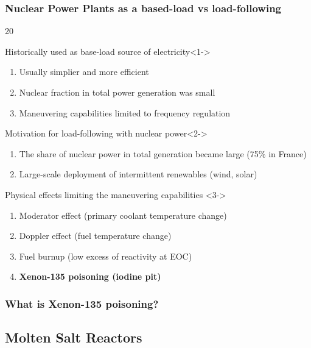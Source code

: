 \begin{frame}
\frametitle{Nuclear Power Plants as a based-load vs load-following}
	\vspace{-4mm}
\begin{overlayarea}{\linewidth}{20\baselineskip}
	\begin{block}{Historically used as base-load source of electricity}<1->
		\begin{enumerate}
			\item Usually simplier and more efficient
			\item Nuclear fraction in total power generation was small
			\item Maneuvering capabilities limited to frequency regulation
		\end{enumerate}
	\end{block}
	\begin{block}{Motivation for load-following with nuclear power}<2->
	\begin{enumerate}
		\item The share of nuclear power in total generation became large 
		(75\% in France)
		\item Large-scale deployment of intermittent renewables (wind, solar)
	\end{enumerate}
	\end{block}
	\begin{block}{Physical effects limiting the maneuvering capabilities 
		\cite{lokhov_technical_2011}}<3->
	\begin{enumerate}
		\item<3-> Moderator effect (primary coolant temperature change)
		\item<3-> Doppler effect (fuel temperature change)
		\item<4-> Fuel burnup (low excess of reactivity at EOC)
		\item<5-> \textbf{Xenon-135 poisoning (iodine pit)}
	\end{enumerate}
\end{block}
\end{overlayarea}
\end{frame}

\begin{frame}
\frametitle{What is Xenon-135 poisoning?}
\end{frame}

\subsection{Molten Salt Reactors}

